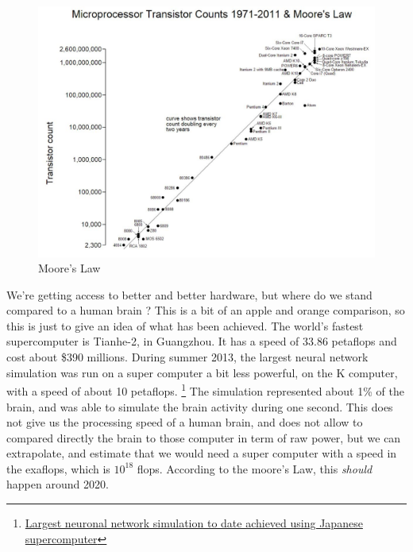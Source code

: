 \documentclass[12pt]{article}
\begin{document}
\begin{figure}[h]
    \centering
    \includegraphics[width=\textwidth]{moore}
    \caption{Moore's Law}
    \label{fig:moore}
\end{figure}


We're getting access to better and better hardware, but where do we stand
compared to a human brain ? This is a bit of an apple and orange comparison, so
this is just to give an idea of what has been achieved. The world's fastest
supercomputer is Tianhe-2, in Guangzhou. It has a speed of 33.86 \gls{petaflops}
and cost about \$390 millions. During summer 2013, the largest neural network
simulation was run on a super computer a bit less powerful, on the K computer,
with a speed of about 10 petaflops.
\footnote{\href{http://www.sciencedaily.com/releases/2013/08/130802080237.htm}
{Largest neuronal network simulation to date achieved using Japanese
supercomputer}} The simulation represented about 1\% of the brain, and was able
to simulate the brain activity during one second. This does not give us the
processing speed of a human brain, and does not allow to compared directly the
brain to those computer in term of raw power, but we can extrapolate, and
estimate that we would need a super computer with a speed in the exaflops, which
is $10^18$ flops. According to the moore's Law, this {\em should} happen around
2020.
\end{document}
